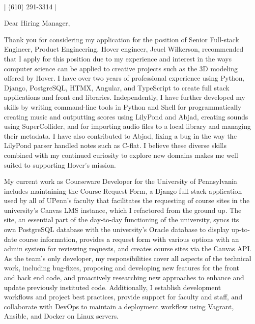\documentclass{letter}
\begin{document}
\begin{flushleft}
     \\

    \vspace{0.2em}

        $|$
        \small{(610) 291-3314}
        $|$
\end{flushleft}

Dear Hiring Manager,

Thank you for considering my application for the position of Senior Full-stack
Engineer, Product Engineering. Hover engineer, Jeuel Wilkerson, recommended that
I apply for this position due to my experience and interest in the ways computer
science can be applied to creative projects such as the 3D modeling offered by
Hover. I have over two years of professional experience using Python, Django,
PostgreSQL, HTMX, Angular, and TypeScript to create full stack applications and
front end libraries. Independently, I have further developed my skills by
writing command-line tools in Python and Shell for programmatically creating
music and outputting scores using LilyPond and Abjad, creating sounds using
SuperCollider, and for importing audio files to a local library and managing
their metadata. I have also contributed to Abjad, fixing a bug in the way the
LilyPond parser handled notes such as C-flat. I believe these diverse skills
combined with my continued curiosity to explore new domains makes me well suited
to supporting Hover’s mission.

My current work as Courseware Developer for the University of Pennsylvania
includes maintaining the Course Request Form, a Django full stack application
used by all of UPenn’s faculty that facilitates the requesting of course sites
in the university’s Canvas LMS instance, which I refactored from the ground up.
The site, an essential part of the day-to-day functioning of the university,
syncs its own PostgreSQL database with the university’s Oracle database to
display up-to-date course information, provides a request form with various
options with an admin system for reviewing requests, and creates course sites
via the Canvas API. As the team’s only developer, my responsibilities cover all
aspects of the technical work, including bug-fixes, proposing and developing new
features for the front and back end code, and proactively researching new
approaches to enhance and update previously instituted code. Additionally, I
establish development workflows and project best practices, provide support for
faculty and staff, and collaborate with DevOps to maintain a deployment workflow
using Vagrant, Ansible, and Docker on Linux servers.
\end{document}
